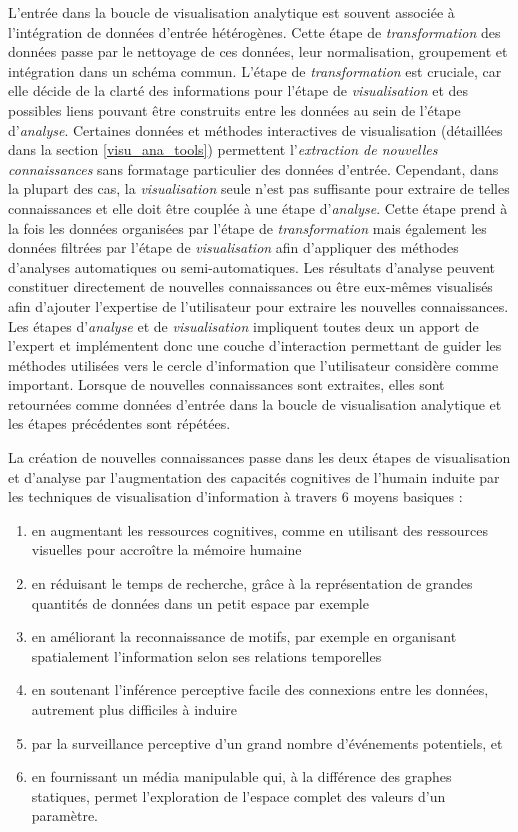L'entrée dans la boucle de visualisation analytique est souvent associée à l'intégration de données d'entrée hétérogènes. Cette étape de \textit{transformation} des données passe par le nettoyage de ces données, leur normalisation, groupement et intégration dans un schéma commun. L'étape de \textit{transformation} est cruciale, car elle décide de la clarté des informations pour l'étape de \textit{visualisation} et des possibles liens pouvant être construits entre les données au sein de l'étape d'\textit{analyse}. Certaines données et méthodes interactives de visualisation (détaillées dans la section \ref{visu_ana_tools}) permettent l'\textit{extraction de nouvelles connaissances} sans formatage particulier des données d'entrée. Cependant, dans la plupart des cas, la \textit{visualisation} seule n'est pas suffisante pour extraire de telles connaissances et elle doit être couplée à une étape d'\textit{analyse}. Cette étape prend à la fois les données organisées par l'étape de \textit{transformation} mais également les données filtrées par l'étape de \textit{visualisation} afin d'appliquer des méthodes d'analyses automatiques ou semi-automatiques. Les résultats d'analyse peuvent constituer directement de nouvelles connaissances ou être eux-mêmes visualisés afin d'ajouter l'expertise de l'utilisateur pour extraire les nouvelles connaissances. Les étapes d'\textit{analyse} et de \textit{visualisation} impliquent toutes deux un apport de l'expert et implémentent donc une couche d'interaction permettant de guider les méthodes utilisées vers le cercle d'information que l'utilisateur considère comme important. Lorsque de nouvelles connaissances sont extraites, elles sont retournées comme données d'entrée dans la boucle de visualisation analytique et les étapes précédentes sont répétées.


La création de nouvelles connaissances passe dans les deux étapes de visualisation et d'analyse par l'augmentation des capacités cognitives de l'humain induite par les techniques de visualisation d'information à travers 6 moyens basiques \cite{card1999readings,cook_illuminating_2005}:

\begin{enumerate}
  \item en augmentant les ressources cognitives, comme en utilisant des ressources visuelles pour accroître la mémoire humaine
  \item en réduisant le temps de recherche, grâce à la représentation de grandes quantités de données dans un petit espace par exemple
  \item en améliorant la reconnaissance de motifs, par exemple en organisant spatialement l'information selon ses relations temporelles
  \item en soutenant l'inférence perceptive facile des connexions entre les données, autrement plus difficiles à induire
  \item par la surveillance perceptive d'un grand nombre d'événements potentiels, et
  \item en fournissant un média manipulable qui, à la différence des graphes statiques, permet l'exploration de l'espace complet des valeurs d'un paramètre.
\end{enumerate}

